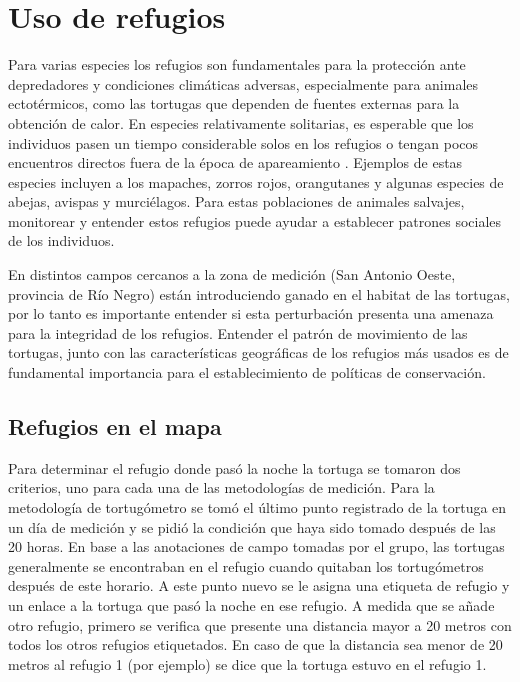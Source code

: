 \chapter{Uso de refugios}
 
 
Para varias especies los refugios son fundamentales para la protección ante depredadores y  condiciones climáticas adversas, especialmente para animales ectotérmicos, como las tortugas que dependen de fuentes externas para la obtención de calor. En especies relativamente solitarias, es esperable que los individuos pasen un tiempo considerable solos en los refugios o tengan pocos encuentros directos fuera de la época de apareamiento \cite{bipartitasTortusPaper}. Ejemplos de estas especies incluyen a los mapaches, zorros rojos, orangutanes y algunas especies de abejas, avispas y murciélagos. Para estas poblaciones de animales salvajes, monitorear y entender estos refugios puede ayudar a establecer patrones sociales de los individuos.
 
En distintos campos cercanos a la zona de medición (San Antonio Oeste, provincia de Río Negro) están introduciendo ganado en el habitat de las tortugas, por lo tanto es importante entender si esta perturbación presenta una amenaza para la integridad de los refugios. Entender el patrón de movimiento  de las tortugas, junto con las características geográficas de los refugios más usados es de fundamental importancia para el establecimiento de políticas de conservación.
 
\section{Refugios en el mapa}
Para determinar el refugio donde pasó la noche la tortuga se tomaron dos criterios, uno para cada una de las metodologías de medición. Para la metodología de tortugómetro se tomó el último punto registrado de la tortuga en un día de medición y se pidió la condición que haya sido tomado después de las 20 horas. En base a las anotaciones de campo tomadas por el grupo, las tortugas generalmente  se encontraban en el refugio cuando quitaban los tortugómetros después de este horario. A este punto nuevo se le asigna una etiqueta de refugio y un enlace a la tortuga que pasó la noche en ese refugio. A medida que se añade otro refugio, primero se verifica que presente una distancia mayor a 20 metros con todos los otros refugios etiquetados. En caso de que la distancia sea menor de 20 metros al refugio 1 (por ejemplo) se dice que la tortuga estuvo en el refugio 1.
                 
